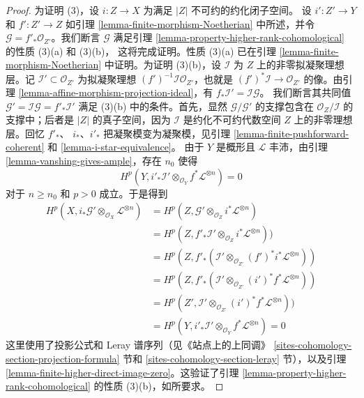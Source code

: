 \begin{proof}
\medskip\noindent
为证明 (3)，设 $i : Z \to X$ 为满足 $|Z|$ 不可约的约化闭子空间。
设 $i' : Z' \to Y$ 和 $f' : Z' \to Z$ 如引理
\ref{lemma-finite-morphism-Noetherian} 中所述，并令
$\mathcal{G} = f'_*\mathcal{O}_{Z'}$。我们断言 $\mathcal{G}$ 满足引理
\ref{lemma-property-higher-rank-cohomological} 的性质 (3)(a) 和 (3)(b)，
这将完成证明。性质 (3)(a) 已在引理
\ref{lemma-finite-morphism-Noetherian} 中证明。为证明 (3)(b)，设
$\mathcal{I}$ 为 $Z$ 上的非零拟凝聚理想层。记
$\mathcal{I}' \subset \mathcal{O}_{Z'}$ 为拟凝聚理想
$(f')^{-1}\mathcal{I} \mathcal{O}_{Z'}$，也就是
$(f')^*\mathcal{I} \to \mathcal{O}_{Z'}$ 的像。由引理
\ref{lemma-affine-morphism-projection-ideal}，有
$f_*\mathcal{I}' = \mathcal{I} \mathcal{G}$。%
我们断言其共同值
$\mathcal{G}' = \mathcal{I} \mathcal{G} = f'_*\mathcal{I}'$ 满足 (3)(b)
中的条件。首先，显然 $\mathcal{G}/\mathcal{G}'$ 的支撑包含在
$\mathcal{O}_Z/\mathcal{I}$ 的支撑中；后者是 $|Z|$ 的真子空间，因为
$\mathcal{I}$ 是约化不可约代数空间 $Z$ 上的非零理想层。回忆 $f'_*$、
$i_*$、$i'_*$ 把凝聚模变为凝聚模，见引理
\ref{lemma-finite-pushforward-coherent} 和 \ref{lemma-i-star-equivalence}。
由于 $Y$ 是概形且 $\mathcal{L}$ 丰沛，由引理
\ref{lemma-vanshing-gives-ample}，存在 $n_0$ 使得%
$$
H^p(Y, i'_*\mathcal{I}' \otimes_{\mathcal{O}_Y} f^*\mathcal{L}^{\otimes n}) = 0
$$
对于 $n \geq n_0$ 和 $p > 0$ 成立。于是得到
\begin{align*}
H^p(X, i_*\mathcal{G}' \otimes_{\mathcal{O}_X} \mathcal{L}^{\otimes n})
& =
H^p(Z, \mathcal{G'} \otimes_{\mathcal{O}_Z} i^*\mathcal{L}^{\otimes n}) \\
& =
H^p(Z,
f'_*\mathcal{I}' \otimes_{\mathcal{O}_Z} i^*\mathcal{L}^{\otimes n})) \\
& =
H^p(Z, f'_*(\mathcal{I}' \otimes_{\mathcal{O}_{Z'}}
(f')^*i^*\mathcal{L}^{\otimes n})) \\
& =
H^p(Z, f'_*(\mathcal{I}' \otimes_{\mathcal{O}_{Z'}}
(i')^*f^*\mathcal{L}^{\otimes n})) \\
& =
H^p(Z',
\mathcal{I}' \otimes_{\mathcal{O}_{Z'}} (i')^*f^*\mathcal{L}^{\otimes n})) \\
& =
H^p(Y, i'_*\mathcal{I}' \otimes_{\mathcal{O}_Y} f^*\mathcal{L}^{\otimes n}) = 0
\end{align*}
这里使用了投影公式和 Leray 谱序列（见《站点上的上同调》
\ref{sites-cohomology-section-projection-formula} 节和
\ref{sites-cohomology-section-leray} 节），以及引理
\ref{lemma-finite-higher-direct-image-zero}。这验证了引理
\ref{lemma-property-higher-rank-cohomological} 的性质 (3)(b)，如所要求。
\end{proof}










